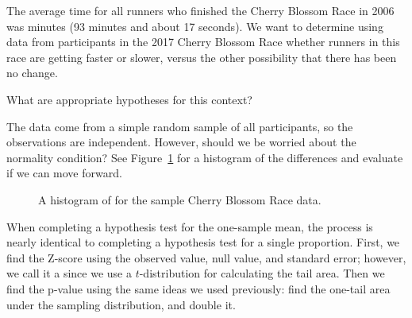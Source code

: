 The average time for all runners who finished the Cherry Blossom Race in 2006 was \cherryblossomnull{} minutes (93 minutes and about 17 seconds). We want to determine using data from \cherryblossomn{} participants in the 2017 Cherry Blossom Race whether runners in this race are getting faster or slower, versus the other possibility that there has been no change.

\begin{exercisewrap}
\begin{nexercise}
What are appropriate hypotheses for this context?\footnotemark{}
\end{nexercise}
\end{exercisewrap}

\begin{exercisewrap}
\begin{nexercise}
The data come from a simple random sample of all participants,
so the observations are independent.
However, should we be worried about the normality condition?
See Figure~\ref{run10SampTimeHistogram} for a histogram
of the differences and evaluate if we can move
forward.\footnotemark{}
\end{nexercise}
\end{exercisewrap}

\begin{figure}[h]
  \centering
  \caption{A histogram of  for the sample
      Cherry Blossom Race data.}
  \label{run10SampTimeHistogram}
\end{figure}

When completing a hypothesis test for the one-sample mean,
the process is nearly identical to completing a hypothesis
test for a single proportion.
First, we find the Z-score using the observed value,
null value, and standard error;
however, we call it a  since we use
a $t$-distribution for calculating the tail area.
Then we find the p-value using the same ideas we used
previously: find the one-tail area under the sampling
distribution, and double it.

